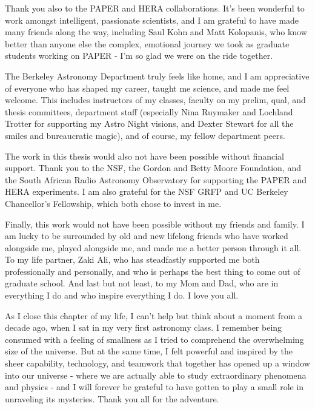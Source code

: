\documentclass[12pt]{myucthesis}
\begin{document}
\begin{frontmatter}
\begin{acknowledgements}
Thank you also to the PAPER and HERA collaborations. It's been wonderful to work amongst intelligent, passionate scientists, and I am grateful to have made many friends along the way, including Saul Kohn and Matt Kolopanis, who know better than anyone else the complex, emotional journey we took as graduate students working on PAPER - I'm so glad we were on the ride together.

The Berkeley Astronomy Department truly feels like home, and I am appreciative of everyone who has shaped my career, taught me science, and made me feel welcome. This includes instructors of my classes, faculty on my prelim, qual, and thesis committees, department staff (especially Nina Ruymaker and Lochland Trotter for supporting my Astro Night visions, and Dexter Stewart for all the smiles and bureaucratic magic), and of course, my fellow department peers. 

The work in this thesis would also not have been possible without financial support. Thank you to the NSF, the Gordon and Betty Moore Foundation, and the South African Radio Astronomy Observatory for supporting the PAPER and HERA experiments. I am also grateful for the NSF GRFP and UC Berkeley Chancellor's Fellowship, which both chose to invest in me.

Finally, this work would not have been possible without my friends and family. I am lucky to be surrounded by old and new lifelong friends who have worked alongside me, played alongside me, and made me a better person through it all. To my life partner, Zaki Ali, who has steadfastly supported me both professionally and personally, and who is perhaps the best thing to come out of graduate school. And last but not least, to my Mom and Dad, who are in everything I do and who inspire everything I do. I love you all.

As I close this chapter of my life, I can't help but think about a moment from a decade ago, when I sat in my very first astronomy class. I remember being consumed with a feeling of smallness as I tried to comprehend the overwhelming size of the universe. But at the same time, I felt powerful and inspired by the sheer capability, technology, and teamwork that together has opened up a window into our universe - where we are actually able to study extraordinary phenomena and physics - and I will forever be grateful to have gotten to play a small role in unraveling its mysteries. Thank you all for the adventure.

\end{acknowledgements}
\end{frontmatter}








{}
\end{document}
